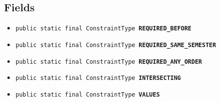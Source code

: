 \documentclass[11pt,a4paper]{report}
\makeatletter
\newcommand{\refdefined}[1]{
\expandafter\ifx\csname r@#1\endcsname\relax
\relax\else
{$($in \ref{#1}, page \pageref{#1}$)$}\fi}
\makeatother
\begin{document}
{{{{{{{{{{{{{			\subsection{Fields}{
				\begin{itemize}
					\item{
						\label{studyplanning.model.workflow.constraint.ConstraintType.REQUIRED_BEFORE}\hypertarget{studyplanning.model.workflow.constraint.ConstraintType.REQUIRED_BEFORE}{\texttt{public static final ConstraintType\ {\bf  REQUIRED\_BEFORE}}}
					}
					\item{
						\label{studyplanning.model.workflow.constraint.ConstraintType.REQUIRED_SAME_SEMESTER}\hypertarget{studyplanning.model.workflow.constraint.ConstraintType.REQUIRED_SAME_SEMESTER}{\texttt{public static final ConstraintType\ {\bf  REQUIRED\_SAME\_SEMESTER}}}
					}
					\item{
						\label{studyplanning.model.workflow.constraint.ConstraintType.REQUIRED_ANY_ORDER}\hypertarget{studyplanning.model.workflow.constraint.ConstraintType.REQUIRED_ANY_ORDER}{\texttt{public static final ConstraintType\ {\bf  REQUIRED\_ANY\_ORDER}}}
					}
					\item{
						\label{studyplanning.model.workflow.constraint.ConstraintType.INTERSECTING}\hypertarget{studyplanning.model.workflow.constraint.ConstraintType.INTERSECTING}{\texttt{public static final ConstraintType\ {\bf  INTERSECTING}}}
					}
					\item{
						\label{studyplanning.model.workflow.constraint.ConstraintType.VALUES}\hypertarget{studyplanning.model.workflow.constraint.ConstraintType.VALUES}{\texttt{public static final ConstraintType\lbrack \rbrack \ {\bf  VALUES}}}
					}
				\end{itemize}
			}
			
}}}}}}}}}}}}}
\end{document}
